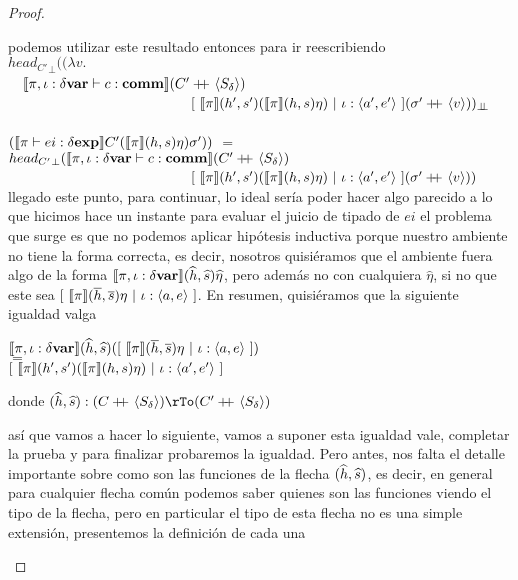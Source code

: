 \begin{proof}
\begin{itemize}
\begin{itemize}
podemos utilizar este resultado entonces para ir reescribiendo\\

${head_{C'}}_{\bot} ((\lambda v .$ \\
\indent \ \ 
	$\llbracket \pi,\iota:\delta \textbf{var} \vdash c : \textbf{comm} \rrbracket(C' +\kern-1.3ex+\kern0.8ex \langle S_\delta \rangle)$\\
\indent \ \ \ \ \ \ \ \ \ \ \ \ \ \ \ \ \ \ \ \ \ \ \ \ \ \
			$[ \ \semBrcks{\pi}(h',s')(\semBrcks{\pi}(h,s)\eta) \ | \ \iota:\lrangles{a',e'} \ ]
			(\sigma' \concat \lrangles{v}))_{\dbot}$\\
\indent \ \ \ \ \ \ \ \ \ \ \ \ \ \ \ \ \ \ \ \ \ \ \ \ \ \ \ \ \ \ \ \ \ \ \ \ \ \ \ \ \ \ \ \ \
 \ \ \ \ \ \ \ \ \ \ \ \ 
	$(\llbracket \pi \vdash ei : \delta \textbf{exp} \rrbracket C'(\llbracket \pi \rrbracket(h,s)\eta)\sigma'))$ $=$\\
${head_{C'}}_{\bot} 
	(\llbracket \pi,\iota:\delta \textbf{var} \vdash c : \textbf{comm} \rrbracket(C' +\kern-1.3ex+\kern0.8ex \langle S_\delta \rangle)$\\
\indent \ \ \ \ \ \ \ \ \ \ \ \ \ \ \ \ \ \ \ \ \ \ \ \ \ \
			$[ \ \semBrcks{\pi}(h',s')(\semBrcks{\pi}(h,s)\eta) \ | \ \iota:\lrangles{a',e'} \ ]
			(\sigma' \concat \lrangles{v}))$\\
			
llegado este punto, para continuar, lo ideal ser\'ia poder hacer algo parecido
a lo que hicimos hace un instante para evaluar el juicio de tipado de $ei$ el problema
que surge es que no podemos aplicar hip\'otesis inductiva porque nuestro ambiente
no tiene la forma correcta, es decir, nosotros quisi\'eramos que el ambiente
fuera algo de la forma $\llbracket \pi,\iota:\delta \textbf{var} \rrbracket(\widehat{h},\widehat{s})\widehat{\eta}$, pero
adem\'as no con cualquiera $\widehat{\eta}$, si no que este sea
$[ \ \semBrcks{\pi}(\hover,\sover)\eta \ | \ \iota:\lrangles{a,e} \ ]$. 
En resumen, quisi\'eramos que la siguiente igualdad valga

\begin{center}
$\semBrcks{\pi,\iota:\deltavar}(\hhat,\shat)
([ \ \semBrcks{\pi}(\hover,\sover)\eta \ | \ \iota:\lrangles{a,e} \ ])$\\ 
$=$\\
$[ \ \semBrcks{\pi}(h',s')(\semBrcks{\pi}(h,s)\eta) \ | \ \iota:\lrangles{a',e'} \ ]$
\end{center}

donde
$(\hhat,\shat) : (C\concat\lrangles{S_\delta}) \rTo (C'\concat\lrangles{S_\delta})$ 

as\'i que vamos a hacer lo siguiente, vamos a suponer esta igualdad vale, completar la prueba
y para finalizar probaremos la igualdad. Pero antes, nos falta el detalle importante sobre
como son las funciones de la flecha $(\widehat{h},\widehat{s})$, es decir, en general para cualquier
flecha com\'un podemos saber quienes son las funciones viendo el tipo de la flecha, pero
en particular el tipo de esta flecha no es una simple extensi\'on, presentemos la definici\'on
de cada una\\


\end{itemize}
\end{itemize}
\end{proof}
